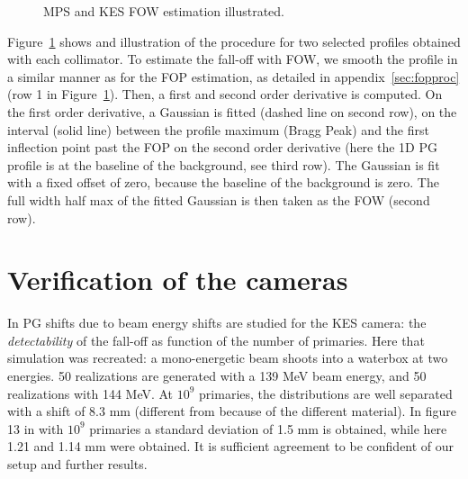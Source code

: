\documentclass[a4paper,english,12pt]{article}
\begin{document}
\begin{figure}[htp]
  \centering
  \quad
  \caption{\label{FOWILLUS} MPS and KES FOW estimation illustrated.}
\end{figure}

Figure~\ref{FOWILLUS} shows and illustration of the procedure for two selected profiles obtained with each collimator. To estimate the fall-off with FOW, we smooth the profile in a similar manner as for the FOP estimation, as detailed in appendix~\ref{sec:fopproc} (row 1 in Figure~\ref{FOWILLUS}). Then, a first and second order derivative is computed. On the first order derivative, a Gaussian is fitted (dashed line on second row), on the interval (solid line) between the profile maximum (Bragg Peak) and the first inflection point past the FOP on the second order derivative (here the 1D PG profile is at the baseline of the background, see third row). The Gaussian is fit with a fixed offset of zero, because the baseline of the background is zero. The full width half max of the fitted Gaussian is then taken as the FOW (second row).


\section{Verification of the cameras}

In \cite{Priegnitz2015} PG shifts due to beam energy shifts are studied for the KES camera: the \emph{detectability} of the fall-off as function of the number of primaries. Here that simulation was recreated: a mono-energetic beam shoots into a waterbox at two energies. 50 realizations are generated with a 139 MeV beam energy, and 50 realizations with 144 MeV. At $10^9$ primaries, the distributions are well separated with a shift of 8.3 mm (different from \cite{Priegnitz2015} because of the different material). In figure 13 in \cite{Perali2014} with $10^9$ primaries a standard deviation of 1.5 mm is obtained, while here 1.21 and 1.14 mm were obtained. It is sufficient agreement to be confident of our setup and further results.
\end{document}
